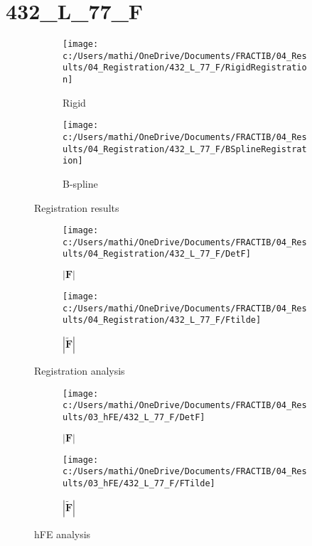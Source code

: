 \documentclass{article}%
\begin{document}
%
\normalsize%
\section*{432\_L\_77\_F}%
\label{sec:432L77F}%


\begin{figure}[h!]%
\begin{subfigure}[b]{0.5\linewidth}%
\texttt{[image: c:/Users/mathi/OneDrive/Documents/FRACTIB/04\_Results/04\_Registration/432\_L\_77\_F/RigidRegistration]}%
\caption{Rigid}%
\end{subfigure}%
\begin{subfigure}[b]{0.5\linewidth}%
\texttt{[image: c:/Users/mathi/OneDrive/Documents/FRACTIB/04\_Results/04\_Registration/432\_L\_77\_F/BSplineRegistration]}%
\caption{B{-}spline}%
\end{subfigure}%
\caption{Registration results}%
\end{figure}

%


\begin{figure}[h!]%
\begin{subfigure}[b]{0.5\linewidth}%
\texttt{[image: c:/Users/mathi/OneDrive/Documents/FRACTIB/04\_Results/04\_Registration/432\_L\_77\_F/DetF]}%
\caption{$|\mathbf{F}|$}%
\end{subfigure}%
\begin{subfigure}[b]{0.5\linewidth}%
\texttt{[image: c:/Users/mathi/OneDrive/Documents/FRACTIB/04\_Results/04\_Registration/432\_L\_77\_F/Ftilde]}%
\caption{$|\widetilde{\mathbf{F}}|$}%
\end{subfigure}%
\caption{Registration analysis}%
\end{figure}

%


\begin{figure}[h!]%
\begin{subfigure}[b]{0.5\linewidth}%
\texttt{[image: c:/Users/mathi/OneDrive/Documents/FRACTIB/04\_Results/03\_hFE/432\_L\_77\_F/DetF]}%
\caption{$|\mathbf{F}|$}%
\end{subfigure}%
\begin{subfigure}[b]{0.5\linewidth}%
\texttt{[image: c:/Users/mathi/OneDrive/Documents/FRACTIB/04\_Results/03\_hFE/432\_L\_77\_F/FTilde]}%
\caption{$|\widetilde{\mathbf{F}}|$}%
\end{subfigure}%
\caption{hFE analysis}%
\end{figure}
\end{document}
